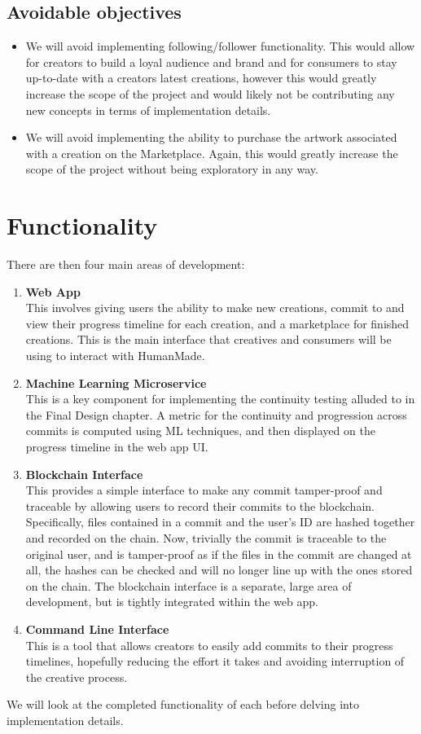 \documentclass[12pt,a4paper]{article}
\begin{document}
\subsection{Avoidable objectives}
\begin{itemize}
    \item We will avoid implementing following/follower functionality. This would allow for creators to build a loyal audience and brand and for consumers to stay up-to-date with a creators latest creations, however this would greatly increase the scope of the project and would likely not be contributing any new concepts in terms of implementation details.
    \item We will avoid implementing the ability to purchase the artwork associated with a creation on the Marketplace. Again, this would greatly increase the scope of the project without being exploratory in any way.
\end{itemize}

\section{Functionality}
There are then four main areas of development:
\begin{enumerate}
    \item \textbf{Web App} \\This involves giving users the ability to make new creations, commit to and view their progress timeline for each creation, and a marketplace for finished creations. This is the main interface that creatives and consumers will be using to interact with HumanMade.
    \item \textbf{Machine Learning Microservice} \\This is a key component for implementing the continuity testing alluded to in the Final Design chapter. A metric for the continuity and progression across commits is computed using ML techniques, and then displayed on the progress timeline in the web app UI.
    \item \textbf{Blockchain Interface} \\This provides a simple interface to make any commit tamper-proof and traceable by allowing users to record their commits to the blockchain. Specifically, files contained in a commit and the user's ID are hashed together and recorded on the chain. Now, trivially the commit is traceable to the original user, and is tamper-proof as if the files in the commit are changed at all, the hashes can be checked and will no longer line up with the ones stored on the chain. The blockchain interface is a separate, large area of development, but is tightly integrated within the web app.
    \item \textbf{Command Line Interface} \\This is a tool that allows creators to easily add commits to their progress timelines, hopefully reducing the effort it takes and avoiding interruption of the creative process.
\end{enumerate}
We will look at the completed functionality of each before delving into implementation details.
\end{document}
